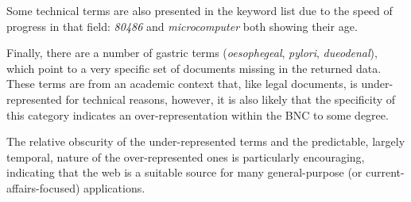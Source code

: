 Some technical terms are also presented in the keyword list due to the speed of progress in that field: \textsl{80486} and \textsl{microcomputer} both showing their age.

Finally, there are a number of gastric terms (\textsl{oesophegeal}, \textsl{pylori}, \textsl{dueodenal}), which point to a very specific set of documents missing in the returned data.  These terms are from an academic context that, like legal documents, is under-represented for technical reasons, however, it is also likely that the specificity of this category indicates an over-representation within the BNC to some degree.

The relative obscurity of the under-represented terms and the predictable, largely temporal, nature of the over-represented ones is particularly encouraging, indicating that the web is a suitable source for many general-purpose (or current-affairs-focused) applications.













